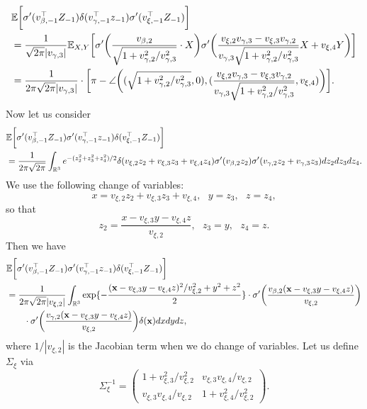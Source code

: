 \begin{align*}
	& {\mathbb{E}} \bigg[\sigma'(v_{\beta, -1}^\top Z_{-1})  \delta(v_{\gamma, -1}^\top z_{-1}) \sigma'(v_{\xi, -1}^\top Z_{-1})\bigg] \\
	& = \frac{1}{\sqrt{2\pi} |v_{\gamma, 3}|} {\mathbb{E}}_{X, Y} \bigg[ \sigma'\bigg(\frac{v_{\beta, 2}}{\sqrt{1+ v_{\gamma, 2}^2 / v_{\gamma, 3}^2}}\cdot X\bigg)\sigma'\bigg( \frac{v_{\xi, 2}v_{\gamma, 3} - v_{\xi, 3}v_{\gamma, 2}}{v_{\gamma, 3}\sqrt{1+ v_{\gamma, 2}^2 / v_{\gamma, 3}^2}} X + v_{\xi, 4} Y \bigg)\bigg] \\
	& = \frac{1}{2\pi\sqrt{2\pi}|v_{\gamma, 3}|}  \cdot \bigg[\pi - \angle\bigg((\sqrt{1+ v_{\gamma, 2}^2 / v_{\gamma, 3}^2} , 0), (\frac{v_{\xi, 2}v_{\gamma, 3} - v_{\xi, 3}v_{\gamma, 2}}{v_{\gamma, 3}\sqrt{1+ v_{\gamma, 2}^2 / v_{\gamma, 3}^2}}, v_{\xi, 4})  \bigg)\bigg].
\end{align*}
Now let us consider
\begin{align*}
	& {\mathbb{E}} \bigg[\sigma'(v_{\beta, -1}^\top Z_{-1})  \sigma'(v_{\gamma, -1}^\top z_{-1}) \delta(v_{\xi, -1}^\top Z_{-1})\bigg]	 \\
	& = \frac{1}{2\pi\sqrt{2\pi}} \int_{{\mathbb{R}}^3} e^{-(z_2^2 + z_3^2 + z_4^2)/2} \delta(v_{\xi, 2}z_2 + v_{\xi, 3}z_3 + v_{\xi, 4} z_4) \sigma'(v_{\beta, 2}z_2) \sigma'(v_{\gamma, 2}z_2 + v_{\gamma, 3} z_3) dz_2d z_3 dz_4.
\end{align*}
We use the following change of variables:
\[
	x = v_{\xi, 2} z_2 + v_{\xi, 3} z_3 + v_{\xi, 4}, \ \ \ y = z_3, \ \ \ z = z_4,
\]
so that
\[
	z_2 = \frac{x - v_{\xi, 3} y - v_{\xi, 4} z}{v_{\xi, 2}},  \ \ \ z_3 = y, \ \ \ z_4 = z.
\]
Then we have
\begin{align*}
	& {\mathbb{E}} \bigg[\sigma'(v_{\beta, -1}^\top Z_{-1})  \sigma'(v_{\gamma, -1}^\top z_{-1}) \delta(v_{\xi, -1}^\top Z_{-1})\bigg] \\
	& = \frac{1}{2\pi\sqrt{2\pi} |v_{\xi, 2}|} \int_{{\mathbb{R}}^3} \exp\{-\frac{({\mathbf{x}}  - v_{\xi, 3} y - v_{\xi, 4} z)^2/v_{\xi, 2}^2 + y^2 + z^2}{2}\} \cdot  \sigma'\bigg(\frac{v_{\beta, 2} ({\mathbf{x}}  - v_{\xi, 3} y - v_{\xi, 4}z)}{v_{\xi, 2}}\bigg) \\
	& \qquad \cdot \sigma'\bigg(\frac{v_{\gamma , 2} ({\mathbf{x}}  - v_{\xi, 3}y - v_{\xi, 4} z)}{v_{\xi, 2}}\bigg) \delta({\mathbf{x}} ) dxdydz,
\end{align*}
where $1/|v_{\xi, 2}|$ is the Jacobian term when we do change of variables. Let us define $\Sigma_\xi$ via
\[
	\Sigma_\xi^{-1} =  
	\begin{pmatrix}
		1 + v_{\xi, 3}^2/v_{\xi, 2}^2 & v_{\xi, 3} v_{\xi, 4} / v_{\xi, 2} \\
		v_{\xi, 3} v_{\xi, 4} / v_{\xi, 2} & 1 + v_{\xi, 4}^2 / v_{\xi, 2}^2
	\end{pmatrix}.
\]
